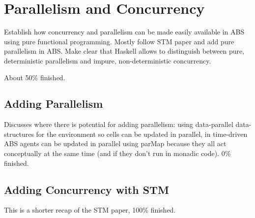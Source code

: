 \chapter{Parallelism and Concurrency}
Establish how concurrency and parallelism can be made easily available in ABS using pure functional programming. Mostly follow STM paper and add pure parallelism in ABS. Make clear that Haskell allows to distinguish between pure, deterministic parallelism and impure, non-deterministic concurrency.

About 50\% finished.

\section{Adding Parallelism}
Discusses where there is potential for adding parallelism: using data-parallel data-structures for the environment so cells can be updated in parallel, in time-driven ABS agents can be updated in parallel using parMap because they all act conceptually at the same time (and if they don't run in monadic code). 0\% finished.

\section{Adding Concurrency with STM}
This is a shorter recap of the STM paper, 100\% finished.